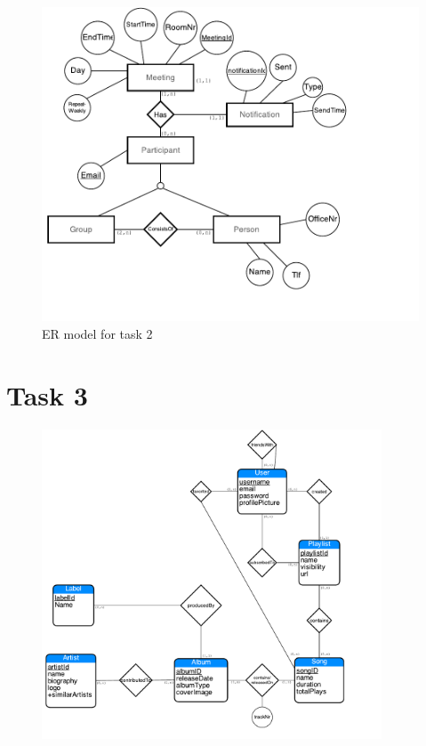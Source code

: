 \documentclass[paper=a4, fontsize=11pt]{scrartcl} %
\numberwithin{equation}{section} %
\numberwithin{figure}{section} %
\numberwithin{table}{section} %
\begin{document}
\begin{figure}[h!]
\centering
\includegraphics[]{oppg2.pdf}
\caption{ER model for task 2}
\end{figure}

\newpage
\section*{Task 3}

\begin{figure}[h!]
\centering
\includegraphics[width=0.9\textwidth]{oppg3.pdf}
\end{figure}
\end{document}
